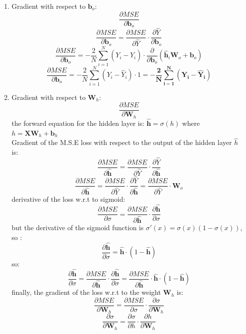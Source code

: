 \documentclass{article}
\begin{document}
\begin{enumerate}
    \item Gradient with respect to $\mathbf{b}_o$: $$\frac{\partial MSE}{\partial \mathbf{b}_o}$$
    \[
        \frac{\partial MSE}{\partial \mathbf{b}_o} = \frac{\partial MSE}{\partial \hat{Y}} \cdot \frac{\partial \hat{Y}}{\partial \mathbf{b}_o}
        \]
        \[
            \frac{\partial MSE}{\partial \mathbf{b}_o} = -\frac{2}{N} \sum_{i=1}^{N} (Y_i - \hat{Y}_i) \cdot \frac{\partial}{\partial \mathbf{b}_o} (\mathbf{\hat{h}}_i \mathbf{W}_o + \mathbf{b}_o)
            \]
            \[
                \frac{\partial MSE}{\partial \mathbf{b}_o} = -\frac{2}{N} \sum_{i=1}^{N} (Y_i - \hat{Y}_i) \cdot 1 = \mathbf{-\frac{2}{N} \sum_{i=1}^{N} (Y_i - \hat{Y}_i)}
                \]
    \item Gradient with respect to $\mathbf{W}_h$: $$\frac{\partial MSE}{\partial \mathbf{W}_h}$$
    the forward equation for the hidden layer is: $\mathbf{\hat{h}} = \sigma(h)$ where $h = \mathbf{X} \mathbf{W}_h + \mathbf{b}_h$ 
    \\ Gradient of the M.S.E loss with respect to the output of the hidden layer $\hat{h}$ is:
    \[
    \frac{\partial MSE}{\partial \mathbf{\hat{h}}} = \frac{\partial MSE}{\partial \hat{Y}} \cdot \frac{\partial \hat{Y}}{\partial \mathbf{\hat{h}}}
    \]
    \[
    \frac{\partial MSE}{\partial \mathbf{\hat{h}}} = \frac{\partial MSE}{\partial \hat{Y}} \cdot \frac{\partial \hat{Y}}{\partial \mathbf{\hat{h}}} = \frac{\partial MSE}{\partial \hat{Y}} \cdot \mathbf{W}_o
    \]
    derivative of the loss w.r.t to sigmoid:
    \[
    \frac{\partial MSE}{\partial \sigma} = \frac{\partial MSE}{\partial \mathbf{\hat{h}}} \cdot \frac{\partial \mathbf{\hat{h}}}{\partial \sigma}
    \]
    but the derivative of the sigmoid function is $\sigma'(x) = \sigma(x)(1 - \sigma(x))$, so :
    \[
        \frac{\partial \mathbf{\hat{h}}}{\partial \sigma} = \mathbf{\hat{h}} \cdot (1 - \mathbf{\hat{h}})
    \]
    so:
    \[
        \frac{\partial \mathbf{\hat{h}}}{\partial \sigma} = \frac{\partial MSE}{\partial \mathbf{\hat{h}}} \cdot \frac{\partial \mathbf{\hat{h}}}{\partial \sigma} = \frac{\partial MSE}{\partial \mathbf{\hat{h}}} \cdot \mathbf{\hat{h}} \cdot (1 - \mathbf{\hat{h}})
    \]
    finally, the gradient of the loss w.r.t to the weight $\mathbf{W}_h$ is:
    \[
    \frac{\partial MSE}{\partial \mathbf{W}_h} = \frac{\partial MSE}{\partial \sigma} \cdot \frac{\partial \sigma}{\partial \mathbf{W}_h}
    \]
    \[
    \frac{\partial \sigma}{\partial \mathbf{W}_h} = \frac{\partial \sigma}{\partial h} \cdot \frac{\partial h}{\partial \mathbf{W}_h}
    \]

\end{enumerate}
\end{document}
